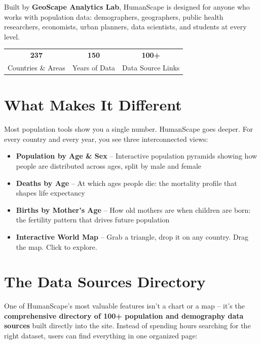 \documentclass[12pt,a4paper]{article}
\begin{document}
Built by \textbf{GeoScape Analytics Lab}, HumanScape is designed for anyone who
works with population data: demographers, geographers, public health researchers,
economists, urban planners, data scientists, and students at every level.

\begin{center}
\begin{tabular}{ccc}
\toprule
\textbf{237} & \textbf{150} & \textbf{100+} \\
Countries \& Areas & Years of Data & Data Source Links \\
\bottomrule
\end{tabular}
\end{center}

\section{What Makes It Different}

Most population tools show you a single number. HumanScape goes deeper. For every
country and every year, you see three interconnected views:

\begin{itemize}[leftmargin=2cm]
\item \textbf{Population by Age \& Sex} -- Interactive population pyramids showing
how people are distributed across ages, split by male and female
\item \textbf{Deaths by Age} -- At which ages people die: the mortality profile that
shapes life expectancy
\item \textbf{Births by Mother's Age} -- How old mothers are when children are born:
the fertility pattern that drives future population
\item \textbf{Interactive World Map} -- Grab a triangle, drop it on any country.
Drag the map. Click to explore.
\end{itemize}

\section{The Data Sources Directory}

One of HumanScape's most valuable features isn't a chart or a map -- it's the
\textbf{comprehensive directory of 100+ population and demography data sources}
built directly into the site. Instead of spending hours searching for the right
dataset, users can find everything in one organized page:

\vspace{0.3cm}
\end{document}
